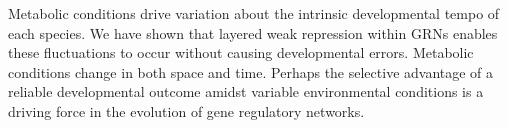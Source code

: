 Metabolic conditions drive variation about the intrinsic developmental tempo of each species. We have shown that layered weak repression within GRNs enables these fluctuations to occur without causing developmental errors. Metabolic conditions change in both space and time. Perhaps the selective advantage of a reliable developmental outcome amidst variable environmental conditions is a driving force in the evolution of gene regulatory networks.
